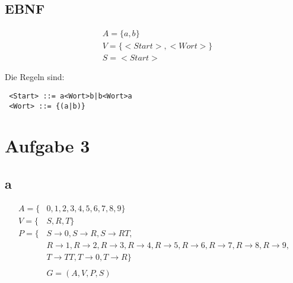 \documentclass[a4paper,10pt]{article}
\begin{document}
\subsection*{EBNF}

\begin{align*}
 & A = \{a, b\}\\
 & V = \{<Start>, <Wort>\}\\
 & S = <Start>
\end{align*}

Die Regeln sind:
\begin{lstlisting}
 <Start> ::= a<Wort>b|b<Wort>a
 <Wort> ::= {(a|b)}
\end{lstlisting}

\section*{Aufgabe 3}

\subsection*{a}

\begin{align*}
 A = \{&0, 1, 2, 3, 4, 5, 6, 7, 8, 9\}\\
 V = \{&S, R, T\}\\
 P = \{&S \rightarrow 0, S \rightarrow R, S \rightarrow RT,\\
 & R \rightarrow 1, R \rightarrow 2, R \rightarrow 3, R \rightarrow 4, R \rightarrow 5, R \rightarrow 6, R \rightarrow 7, R \rightarrow 8, R \rightarrow 9,\\
 & T \rightarrow TT, T \rightarrow 0, T \rightarrow R\}\\
 \\
 & G = (A, V, P, S)
\end{align*}
\end{document}
